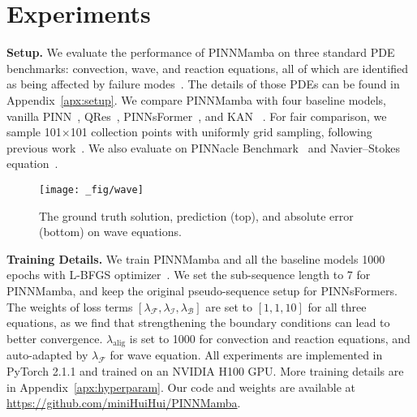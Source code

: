 

\section{Experiments}
\textbf{Setup.} We evaluate the performance of PINNMamba on three standard PDE benchmarks: convection, wave, and reaction equations, all of which are identified as being affected by failure modes~\cite{krishnapriyan2021characterizing,zhao2024pinnsformer}. The details of those PDEs can be found in Appendix~\ref{apx:setup}.
    We compare PINNMamba with four baseline models, vanilla PINN~\cite{raissi2019physics}, QRes~\cite{bu2021quadratic}, PINNsFormer~\cite{zhao2024pinnsformer}, and KAN~\cite{liu2024kan} .
For fair comparison, we sample 101$\times$101 collection points with uniformly grid sampling, following previous work~\cite{zhao2024pinnsformer,wu2024ropinn}. We also evaluate on PINNacle Benchmark~\cite{hao2023pinnacle} and Navier–Stokes equation~\cite{raissi2019physics}.



\begin{figure*}[t!]
    \centering
    \texttt{[image: \_fig/wave]}
    \vspace{-8mm}
    \caption{The ground truth solution, prediction (top), and absolute error (bottom) on wave equations.}
    \label{fig:wave}
    \vspace{-5mm}
\end{figure*}

\textbf{Training Details.} We train PINNMamba and all the baseline models 1000 epochs with L-BFGS optimizer~\cite{liu1989limited}.
We set the sub-sequence length to 7 for PINNMamba, and keep the original pseudo-sequence setup for PINNsFormers. The weights of loss terms $[\lambda_\mathcal F,\lambda_\mathcal I,\lambda_\mathcal B]$ are set to $[1,1,10]$ for all three equations, as we find that strengthening the boundary conditions can lead to better convergence. $\lambda_\text{alig}$ is set to 1000 for convection and reaction equations, and auto-adapted by $\lambda_\mathcal F$ for wave equation.
All experiments are implemented in PyTorch 2.1.1 and trained on an NVIDIA H100 GPU.  More training details are in Appendix~\ref{apx:hyperparam}. Our code and weights are available at \url{https://github.com/miniHuiHui/PINNMamba}.

